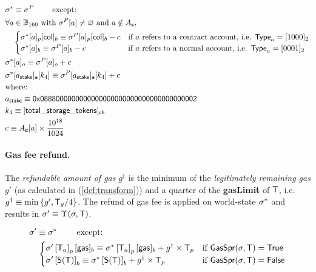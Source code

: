 \begin{align}
	&\st^*  \eqdef \st^{P} \qquad \mbox{  except:}\\
	&\forall a \in \B_{160} \text{ with } \st^{P}[a]\neq\varnothing\text{ and }a\notin A_{\bf s}, \\
	&\quad \begin{cases}
	\st^*[a]_p[{\sf col}]_b \eqdef \st^{P}[a]_p[{\sf col}]_b - c & \mbox{if $a$ refers to a contract account, i.e. $\mathsf{Type}_{a}=\typecontract$} \\
	\st^*[a]_b \eqdef \st^{P}[a]_b - c & \mbox{if $a$ refers to a normal account, i.e. $\mathsf{Type}_{a}= \typenormal$}
	\end{cases}\\
	&\st^*[a]_o \eqdef \st^P[a]_o + c \\ 
	&\st^*[a_{\sf stake}]_{\bf s}[k_4] \eqdef \st^P[a_{\sf stake}]_{\bf s}[k_4] + c \\
	&\mbox{where:}  \\
	&a_{\sf stake} \eqdef \stakingcontract \\ 
	&k_4 \eqdef {\sf [total\char`_storage\char`_tokens]_{\sf ch}} \\
	&c \eqdef A_{\bf c}[a]\times \collateralperbyte
\end{align}

\paragraph{Gas fee refund.}

The \emph{refundable amount of gas} $g^{\dagger}$ is the minimum of the \emph{legitimately remaining gas} $g'$ (as calculated in (\ref{def:transform})) and a quarter of the \textbf{gasLimit} of $\textsf{T}$,
	i.e. $g^{\dagger}\equiv \min{\left \{{g', \textsf{T}_g/4} \right \}}$.
The refund of gas fee is applied on world-state $\mathbf{\sigma}^{*}$ and results in $\mathbf{\sigma}'\equiv \Upsilon(\mathbf{\sigma},\textsf{T})$.

\begin{align}
	& \mathbf{\sigma}'  \equiv \mathbf{\sigma}^* \qquad \mbox{  except:}\\
	& \quad \begin{cases} 
		\mathbf{\sigma}'\left[\textsf{T}_a\right]_p[{\sf gas}]_b \equiv \mathbf{\sigma}^*\left[\textsf{T}_a\right]_p[{\sf gas}]_b+g^{\dagger}\times \textsf{T}_p 
		& \mbox{if $\mathsf{GasSpr}(\mathbf{\sigma},\textsf{T})=\mathsf{True}$}\\
		\mathbf{\sigma}' \left[\mathsf{S}{\left({\textsf{T}} \right)}\right]_b \equiv \mathbf{\sigma}^*\left[\mathsf{S}{\left({\textsf{T}} \right)}\right]_b + g^{\dagger}\times \textsf{T}_p 
		& \mbox{if $\mathsf{GasSpr}(\mathbf{\sigma},\textsf{T})=\mathsf{False}$}
	\end{cases} 
\end{align}


